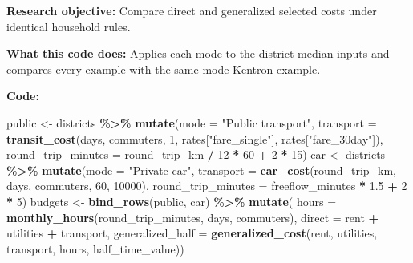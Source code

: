 \documentclass[
]{article}
\newenvironment{Shaded}{\begin{snugshade}}{\end{snugshade}}
\newcommand{\AttributeTok}[1]{\textcolor[rgb]{0.13,0.29,0.53}{#1}}
\newcommand{\DecValTok}[1]{\textcolor[rgb]{0.00,0.00,0.81}{#1}}
\newcommand{\FloatTok}[1]{\textcolor[rgb]{0.00,0.00,0.81}{#1}}
\newcommand{\FunctionTok}[1]{\textcolor[rgb]{0.13,0.29,0.53}{\textbf{#1}}}
\newcommand{\NormalTok}[1]{#1}
\newcommand{\OtherTok}[1]{\textcolor[rgb]{0.56,0.35,0.01}{#1}}
\newcommand{\SpecialCharTok}[1]{\textcolor[rgb]{0.81,0.36,0.00}{\textbf{#1}}}
\newcommand{\StringTok}[1]{\textcolor[rgb]{0.31,0.60,0.02}{#1}}
\begin{document}
\textbf{Research objective:} Compare direct and generalized selected
costs under identical household rules.

\textbf{What this code does:} Applies each mode to the district median
inputs and compares every example with the same-mode Kentron example.

\textbf{Code:}

\begin{Shaded}
\begin{Highlighting}[]
\NormalTok{public }\OtherTok{\textless{}{-}}\NormalTok{ districts }\SpecialCharTok{\%\textgreater{}\%} \FunctionTok{mutate}\NormalTok{(}\AttributeTok{mode =} \StringTok{"Public transport"}\NormalTok{,}
  \AttributeTok{transport =} \FunctionTok{transit\_cost}\NormalTok{(days, commuters, }\DecValTok{1}\NormalTok{, rates[}\StringTok{"fare\_single"}\NormalTok{], rates[}\StringTok{"fare\_30day"}\NormalTok{]),}
  \AttributeTok{round\_trip\_minutes =}\NormalTok{ round\_trip\_km }\SpecialCharTok{/} \DecValTok{12} \SpecialCharTok{*} \DecValTok{60} \SpecialCharTok{+} \DecValTok{2} \SpecialCharTok{*} \DecValTok{15}\NormalTok{)}
\NormalTok{car }\OtherTok{\textless{}{-}}\NormalTok{ districts }\SpecialCharTok{\%\textgreater{}\%} \FunctionTok{mutate}\NormalTok{(}\AttributeTok{mode =} \StringTok{"Private car"}\NormalTok{,}
  \AttributeTok{transport =} \FunctionTok{car\_cost}\NormalTok{(round\_trip\_km, days, commuters, }\DecValTok{60}\NormalTok{, }\DecValTok{10000}\NormalTok{),}
  \AttributeTok{round\_trip\_minutes =}\NormalTok{ freeflow\_minutes }\SpecialCharTok{*} \FloatTok{1.5} \SpecialCharTok{+} \DecValTok{2} \SpecialCharTok{*} \DecValTok{5}\NormalTok{)}
\NormalTok{budgets }\OtherTok{\textless{}{-}} \FunctionTok{bind\_rows}\NormalTok{(public, car) }\SpecialCharTok{\%\textgreater{}\%} \FunctionTok{mutate}\NormalTok{(}
  \AttributeTok{hours =} \FunctionTok{monthly\_hours}\NormalTok{(round\_trip\_minutes, days, commuters),}
  \AttributeTok{direct =}\NormalTok{ rent }\SpecialCharTok{+}\NormalTok{ utilities }\SpecialCharTok{+}\NormalTok{ transport,}
  \AttributeTok{generalized\_half =} \FunctionTok{generalized\_cost}\NormalTok{(rent, utilities, transport, hours, half\_time\_value))}


\end{Highlighting}
\end{Shaded}
\end{document}
